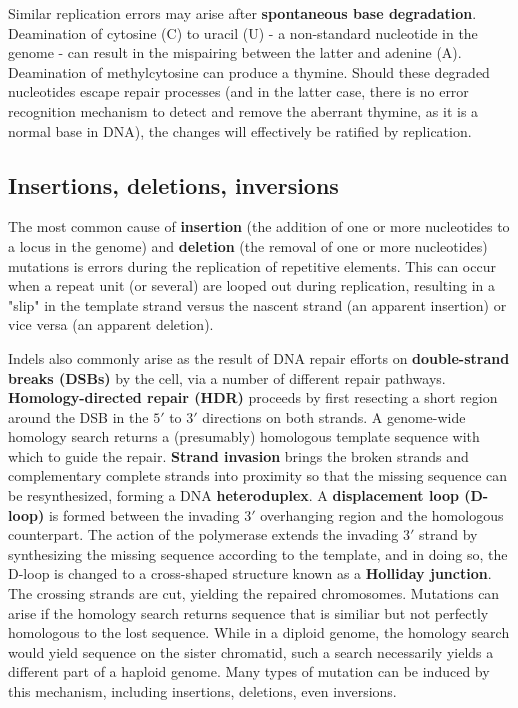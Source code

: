 Similar replication errors may arise after \textbf{spontaneous base degradation}.  Deamination of cytosine (C) to uracil (U) - a non-standard nucleotide in the genome - can result in the mispairing between the latter and adenine (A).  Deamination of methylcytosine can produce a thymine.  Should these degraded nucleotides escape repair processes (and in the latter case, there is no error recognition mechanism to detect and remove the aberrant thymine, as it is a normal base in DNA), the changes will effectively be ratified by replication.

\subsection{Insertions, deletions, inversions}

The most common cause of \textbf{insertion} (the addition of one or more nucleotides to a locus in the genome) and \textbf{deletion} (the removal of one or more nucleotides) mutations is errors during the replication of repetitive elements.  This can occur when a repeat unit (or several) are looped out during replication, resulting in a "slip" in the template strand versus the nascent strand (an apparent insertion) or vice versa (an apparent deletion).

Indels also commonly arise as the result of DNA repair efforts on \textbf{double-strand breaks (DSBs)} by the cell, via a number of different repair pathways.  \textbf{Homology-directed repair (HDR)} proceeds by first resecting a short region around the DSB in the $5'$ to $3'$ directions on both strands.  A genome-wide homology search returns a (presumably) homologous template sequence with which to guide the repair.  \textbf{Strand invasion} brings the broken strands and complementary complete strands into proximity so that the missing sequence can be resynthesized, forming a DNA \textbf{heteroduplex}.  A \textbf{displacement loop (D-loop)} is formed between the invading $3'$ overhanging region and the homologous counterpart.  The action of the polymerase extends the invading $3'$ strand by synthesizing the missing sequence according to the template, and in doing so, the D-loop is changed to a cross-shaped structure known as a \textbf{Holliday junction}.  The crossing strands are cut, yielding the repaired chromosomes.  Mutations can arise if the homology search returns sequence that is similiar but not perfectly homologous to the lost sequence.  While in a diploid genome, the homology search would yield sequence on the sister chromatid, such a search necessarily yields a different part of a haploid genome.  Many types of mutation can be induced by this mechanism, including insertions, deletions, even inversions.

